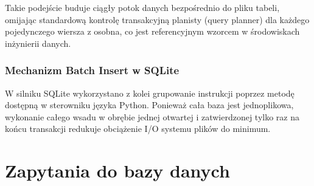 \documentclass[a4paper,11pt,english,openany,oneside]{sphinxmanual}
\begin{document}
\begin{sphinxVerbatim}[commandchars=\\\{\}]

   
     
      
           

\end{sphinxVerbatim}

\sphinxAtStartPar
Takie podejście buduje ciągły potok danych bezpośrednio do pliku tabeli, omijając standardową kontrolę transakcyjną planisty (query planner) dla każdego pojedynczego wiersza z osobna, co jest referencyjnym wzorcem w środowiskach inżynierii danych.


\subsection{Mechanizm Batch Insert w SQLite}
\label{\detokenize{rozdzial_4/index:mechanizm-batch-insert-w-sqlite}}
\sphinxAtStartPar
W silniku SQLite wykorzystano z kolei grupowanie instrukcji poprzez metodę  dostępną w sterowniku języka Python. Ponieważ cała baza jest jednoplikowa, wykonanie całego wsadu w obrębie jednej otwartej i zatwierdzonej tylko raz na końcu transakcji redukuje obciążenie I/O systemu plików do minimum.

\sphinxstepscope


\chapter{Zapytania do bazy danych}
\label{\detokenize{rozdzial_5/index:zapytania-do-bazy-danych}}\label{\detokenize{rozdzial_5/index::doc}}
\end{document}
